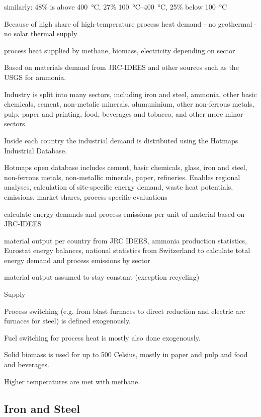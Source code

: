  similarly:
48\% is above \SI{400}{\celsius}, 27\% \SIrange{100}{400}{\celsius}, 25\% below \SI{100}{\celsius}

Because of high share of high-temperature process heat demand
- no geothermal
- no solar thermal supply

process heat supplied by methane, biomass, electricity depending on sector

Based on materials demand from JRC-IDEES and other sources such as the USGS for
ammonia.

Industry is split into many sectors, including iron and steel, ammonia, other
basic chemicals, cement, non-metalic minerals, alumuninium, other non-ferrous
metals, pulp, paper and printing, food, beverages and tobacco, and other more
minor sectors.

Inside each country the industrial demand is distributed using the Hotmaps
Industrial Database.

Hotmaps open database includes cement, basic chemicals, glass, iron and steel, non-ferrous metals,
non-metallic minerals, paper, refineries. Enables regional analyses, calculation of
site-specific energy demand, waste heat potentials, emissions, market shares,
process-specific evaluations

calculate energy demands and process emissions per unit of material based on JRC-IDEES

material output per country from JRC IDEES, ammonia production statistics,
Eurostat energy balances, national statistics from Switzerland to calculate total energy demand
and process emissions by sector

material output assumed to stay constant (exception recycling)

Supply

Process switching (e.g. from blast furnaces to direct reduction and electric arc
furnaces for steel) is defined exogenously.

Fuel switching for process heat is mostly also done exogenously.

Solid biomass is used for up to 500 Celsius, mostly in paper and pulp and food
and beverages.

Higher temperatures are met with methane.


\subsection{Iron and Steel}

